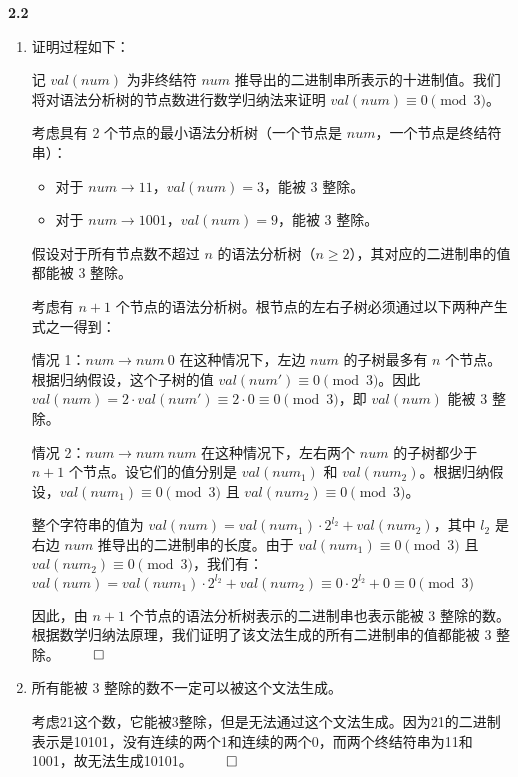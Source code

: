\documentclass[UTF8]{report}
\newcommand{\tbf}[1]{\textbf{#1}}
\renewenvironment{proof}{{\setlength{\parskip}{7pt}\noindent\hskip 2em \bf 证明 \quad}}{\hfill$\qed$\par}
\begin{document}
\noindent
\tbf{2.2}

\begin{enumerate}[label=(\arabic*)]
    \item 证明过程如下：
    
      \begin{proof}
        记 $val(num)$ 为非终结符 $num$ 推导出的二进制串所表示的十进制值。我们将对语法分析树的节点数进行数学归纳法来证明 $val(num) \equiv 0 \pmod{3}$。

        考虑具有 2 个节点的最小语法分析树（一个节点是 $num$，一个节点是终结符串）：
        \begin{itemize}
        \item 对于 $num \rightarrow 11$，$val(num) = 3$，能被 3 整除。
        \item 对于 $num \rightarrow 1001$，$val(num) = 9$，能被 3 整除。
        \end{itemize}

        假设对于所有节点数不超过 $n$ 的语法分析树（$n \geq 2$），其对应的二进制串的值都能被 3 整除。

        考虑有 $n+1$ 个节点的语法分析树。根节点的左右子树必须通过以下两种产生式之一得到：

        情况 1：$num \rightarrow num~0$
        在这种情况下，左边 $num$ 的子树最多有 $n$ 个节点。根据归纳假设，这个子树的值 $val(num') \equiv 0 \pmod{3}$。因此 $val(num) = 2 \cdot val(num') \equiv 2 \cdot 0 \equiv 0 \pmod{3}$，即 $val(num)$ 能被 3 整除。

        情况 2：$num \rightarrow num~num$
        在这种情况下，左右两个 $num$ 的子树都少于 $n+1$ 个节点。设它们的值分别是 $val(num_1)$ 和 $val(num_2)$。根据归纳假设，$val(num_1) \equiv 0 \pmod{3}$ 且 $val(num_2) \equiv 0 \pmod{3}$。

        整个字符串的值为 $val(num) = val(num_1) \cdot 2^{l_2} + val(num_2)$，其中 $l_2$ 是右边 $num$ 推导出的二进制串的长度。由于 $val(num_1) \equiv 0 \pmod{3}$ 且 $val(num_2) \equiv 0 \pmod{3}$，我们有：
        $val(num) = val(num_1) \cdot 2^{l_2} + val(num_2) \equiv 0 \cdot 2^{l_2} + 0 \equiv 0 \pmod{3}$

        因此，由 $n+1$ 个节点的语法分析树表示的二进制串也表示能被 3 整除的数。
        根据数学归纳法原理，我们证明了该文法生成的所有二进制串的值都能被 3 整除。
      \end{proof}
        
    \item 所有能被 3 整除的数不一定可以被这个文法生成。
      
      \begin{proof}
        考虑21这个数，它能被3整除，但是无法通过这个文法生成。因为21的二进制表示是10101，没有连续的两个1和连续的两个0，而两个终结符串为11和1001，故无法生成10101。
      \end{proof}
  \end{enumerate}
\end{document}

